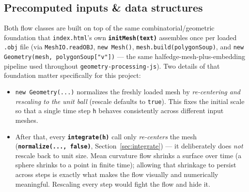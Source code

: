 \documentclass[11pt]{article}
\newcommand{\code}[1]{\texttt{#1}}
\newcommand{\func}[1]{\texttt{\textbf{#1}}}
\newcommand{\type}[1]{\textsc{#1}}
\begin{document}
\begin{center}
\end{center}

\subsection{Precomputed inputs \& data structures}
\label{sec:precompute}

Both flow classes are built on top of the same combinatorial/geometric foundation that
\code{index.html}'s own \func{initMesh(text)} assembles once per loaded \code{.obj} file
(via \code{MeshIO.readOBJ}, \code{new Mesh()}, \code{mesh.build(polygonSoup)}, and
\code{new Geometry(mesh, polygonSoup["v"])} --- the same halfedge-mesh-plus-embedding
pipeline used throughout \code{geometry-processing-js}). Two details of that foundation
matter specifically for this project:

\begin{itemize}[leftmargin=1.6em]
\item \code{new Geometry(...)} normalizes the freshly loaded mesh by \emph{re-centering and
  rescaling to the unit ball} (rescale defaults to \code{true}). This fixes the initial
  scale so that a single time step \code{h} behaves consistently across different input
  meshes.
\item After that, every \func{integrate(h)} call only \emph{re-centers} the mesh
  (\func{normalize(..., false)}, Section~\ref{sec:integrate}) --- it deliberately does
  \emph{not} rescale back to unit size. Mean curvature flow shrinks a surface over time (a
  sphere shrinks to a point in finite time); allowing that shrinkage to persist across steps
  is exactly what makes the flow visually and numerically meaningful. Rescaling every step
  would fight the flow and hide it.
\end{itemize}
\end{document}
